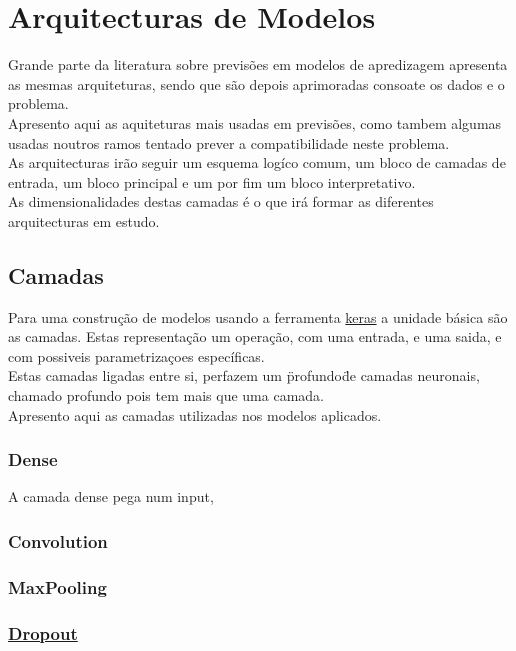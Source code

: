 \chapter{Arquitecturas de Modelos\label{ch:arquiteturas_modelos}}

Grande parte da literatura sobre previsões em modelos de apredizagem apresenta as mesmas arquiteturas, sendo que são depois aprimoradas consoate os dados e o problema. \\
Apresento aqui as aquiteturas mais usadas em previsões, como tambem algumas usadas noutros ramos tentado prever a compatibilidade neste problema. \\
As arquitecturas irão seguir um esquema logíco comum, um bloco de camadas de entrada, um bloco principal e um por fim um bloco interpretativo. \\
As dimensionalidades destas camadas é o que irá formar as diferentes arquitecturas em estudo. \\

\section{Camadas\label{se:layers}}

Para uma construção de modelos usando a ferramenta \href{https://keras.io/}{keras} a unidade básica são as camadas. Estas representação um operação, com uma entrada, e uma saida, e com possiveis parametrizaçoes específicas. \\
Estas camadas ligadas entre si, perfazem um \"profundo\" de camadas neuronais, chamado profundo pois tem mais  que uma camada. \\

Apresento aqui as camadas utilizadas nos modelos aplicados.

\subsection{Dense\label{se:dense_layer}}

A camada dense pega num input, 

\subsection{Convolution\label{se:conv_layer}}
\subsection{MaxPooling\label{se:max_pooling}}
\subsection{\href{https://keras.io/api/layers/regularization_layers/dropout/}{Dropout}\label{se:dropount}}

